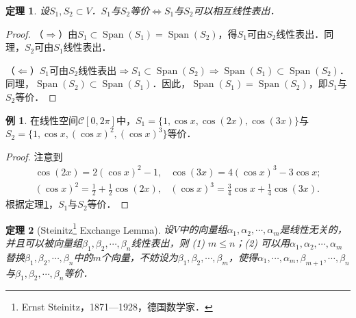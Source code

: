 \documentclass[a4paper,fontset=windows]{ctexbook}
\newtheorem{theorem}{定理}[chapter]
\theoremstyle{definition}
\newtheorem{example}{例}[chapter]
\DeclareMathOperator{\Span}{Span}
\renewcommand{\le}{\leqslant}
\begin{document}
\begin{theorem}\label{thm8.6}
设$S_1,S_2\subset V$．$S_1$与$S_2$等价$\Leftrightarrow S_1$与$S_2$可以相互线性表出．
\end{theorem}

\begin{proof}
（$\Rightarrow$）由$S_1\subset\Span(S_1)=\Span(S_2)$，得$S_1$可由$S_2$线性表出．同理，$S_2$可由$S_1$线性表出．

（$\Leftarrow$）$S_1$可由$S_2$线性表出$\Rightarrow S_1\subset\Span(S_2)\Rightarrow\Span(S_1)\subset\Span(S_2)$．同理，$\Span(S_2)\subset\Span(S_1)$．因此，$\Span(S_1)=\Span(S_2)$，即$S_1$与$S_2$等价．
\end{proof}

\begin{example}
在线性空间$\mathscr{C}[0,2\pi]$中，$S_1=\{1,\cos x,\cos(2x),\cos(3x)\}$与$S_2=\{1,\cos x,(\cos x)^2,(\cos x)^3\}$等价．
\end{example}

\begin{proof}
注意到
$$\begin{array}{ll}
\cos(2x)=2(\cos x)^2-1,&\cos(3x)=4(\cos x)^3-3\cos x; \\
(\cos x)^2=\frac{1}{2}+\frac{1}{2}\cos(2x),&(\cos x)^3=\frac{3}{4}\cos x+\frac{1}{4}\cos(3x).
\end{array}$$
根据定理\ref{thm8.6}，$S_1$与$S_2$等价．
\end{proof}

\begin{theorem}[Steinitz\footnote{Ernst Steinitz，1871—1928，德国数学家．} Exchange Lemma]\label{thm8.7}
设$V$中的向量组$\alpha_1,\alpha_2,\cdots,\alpha_m$是线性无关的，并且可以被向量组$\beta_1,\beta_2,\cdots,\beta_n$线性表出，则 (1) $m\le n$；(2) 可以用$\alpha_1,\alpha_2,\cdots,\alpha_m$替换$\beta_1,\beta_2,\cdots,\beta_n$中的$m$个向量，不妨设为$\beta_1,\beta_2,\cdots,\beta_m$，使得$\alpha_1,\cdots,\alpha_m,\beta_{m+1},\cdots,\beta_n$与$\beta_1,\beta_2,\cdots,\beta_n$等价．
\end{theorem}
\end{document}
